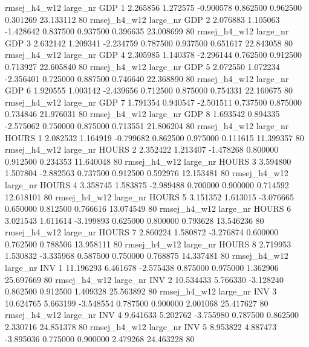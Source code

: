 rmsej_h4_w12   large_nr      GDP                 1  2.265856  1.272575  -0.900578 0.862500 0.962500  0.301269   23.133112 80
rmsej_h4_w12   large_nr      GDP                 2  2.076883  1.105063  -1.428642 0.837500 0.937500  0.396635   23.008699 80
rmsej_h4_w12   large_nr      GDP                 3  2.632142  1.209341  -2.234759 0.787500 0.937500  0.651617   22.843058 80
rmsej_h4_w12   large_nr      GDP                 4  2.305985  1.140378  -2.296144 0.762500 0.912500  0.713927   22.605840 80
rmsej_h4_w12   large_nr      GDP                 5  2.072550  1.072234  -2.356401 0.725000 0.887500  0.746640   22.368890 80
rmsej_h4_w12   large_nr      GDP                 6  1.920555  1.003142  -2.439656 0.712500 0.875000  0.754331   22.160675 80
rmsej_h4_w12   large_nr      GDP                 7  1.791354  0.940547  -2.501511 0.737500 0.875000  0.734846   21.976031 80
rmsej_h4_w12   large_nr      GDP                 8  1.693542  0.894335  -2.575062 0.750000 0.875000  0.713551   21.806204 80
rmsej_h4_w12   large_nr    HOURS                 1  2.082532  1.164919  -0.799682 0.862500 0.975000  0.111615   11.399357 80
rmsej_h4_w12   large_nr    HOURS                 2  2.352422  1.213407  -1.478268 0.800000 0.912500  0.234353   11.640048 80
rmsej_h4_w12   large_nr    HOURS                 3  3.594800  1.507804  -2.882563 0.737500 0.912500  0.592976   12.153481 80
rmsej_h4_w12   large_nr    HOURS                 4  3.358745  1.583875  -2.989488 0.700000 0.900000  0.714592   12.618101 80
rmsej_h4_w12   large_nr    HOURS                 5  3.151352  1.613015  -3.076665 0.650000 0.812500  0.766616   13.074549 80
rmsej_h4_w12   large_nr    HOURS                 6  3.021543  1.611614  -3.199893 0.625000 0.800000  0.793628   13.546236 80
rmsej_h4_w12   large_nr    HOURS                 7  2.860224  1.580872  -3.276874 0.600000 0.762500  0.788506   13.958111 80
rmsej_h4_w12   large_nr    HOURS                 8  2.719953  1.530832  -3.335968 0.587500 0.750000  0.768875   14.337481 80
rmsej_h4_w12   large_nr      INV                 1 11.196293  6.461678  -2.575438 0.875000 0.975000  1.362906   25.697669 80
rmsej_h4_w12   large_nr      INV                 2 10.534433  5.766330  -3.128240 0.862500 0.912500  1.409328   25.563892 80
rmsej_h4_w12   large_nr      INV                 3 10.624765  5.663199  -3.548554 0.787500 0.900000  2.001068   25.417627 80
rmsej_h4_w12   large_nr      INV                 4  9.641633  5.202762  -3.755980 0.787500 0.862500  2.330716   24.851378 80
rmsej_h4_w12   large_nr      INV                 5  8.953822  4.887473  -3.895036 0.775000 0.900000  2.479268   24.463228 80
